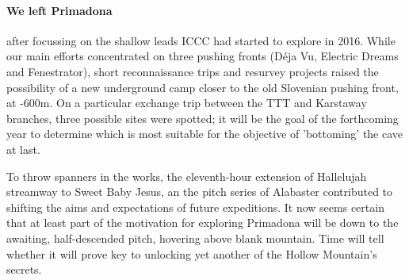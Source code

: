 \newpage
  
\begin{tcolorbox}
	
	\paragraph{We left Primadona} after focussing on the shallow leads ICCC had started to explore in 2016. While our main efforts concentrated on three pushing fronts (Déja Vu, Electric Dreams and Fenestrator), short reconnaissance trips and resurvey projects raised the possibility of a new underground camp closer to the old Slovenian pushing front, at -600m. On a particular exchange trip between the TTT and Karstaway branches, three possible sites were spotted; it will be the goal of the forthcoming year to determine which is most suitable for the objective of 'bottoming' the cave at last. 

	To throw spanners in the works, the eleventh-hour extension of Hallelujah streamway to Sweet Baby Jesus, an the pitch series of Alabaster contributed to shifting the aims and expectations of future expeditions. It now seems certain that at least part of the motivation for exploring Primadona will be down to the awaiting, half-descended pitch, hovering above blank mountain. Time will tell whether it will prove key to unlocking yet another of the Hollow Mountain's secrets.
	\\
	\\
	\\

\end{tcolorbox}

\BgThispage

